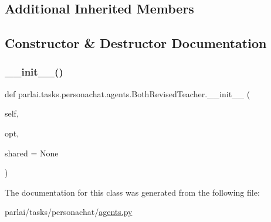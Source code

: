\subsection*{Additional Inherited Members}


\subsection{Constructor \& Destructor Documentation}
\mbox{\label{classparlai_1_1tasks_1_1personachat_1_1agents_1_1BothRevisedTeacher_ad79201b85afa5bfebc40d962550493f8}} 
\subsubsection{\texorpdfstring{\+\_\+\+\_\+init\+\_\+\+\_\+()}{\_\_init\_\_()}}
{\footnotesize\ttfamily def parlai.\+tasks.\+personachat.\+agents.\+Both\+Revised\+Teacher.\+\_\+\+\_\+init\+\_\+\+\_\+ (\begin{DoxyParamCaption}\item[{}]{self,  }\item[{}]{opt,  }\item[{}]{shared = {\ttfamily None} }\end{DoxyParamCaption})}



The documentation for this class was generated from the following file\+:\begin{DoxyCompactItemize}
\item 
parlai/tasks/personachat/\hyperlink{parlai_2tasks_2personachat_2agents_8py}{agents.\+py}\end{DoxyCompactItemize}

